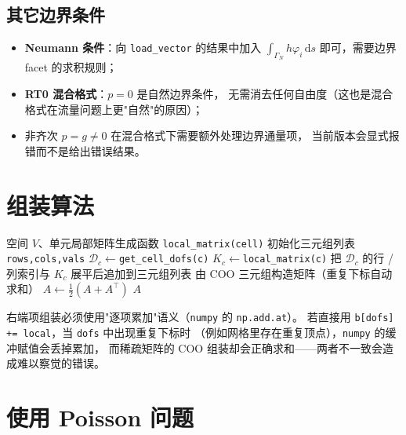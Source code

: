 \documentclass[UTF8,11pt,oneside]{ctexbook}
\theoremstyle{definition}
\theoremstyle{plain}
\newenvironment{caution}{%
  \begin{tcolorbox}[colback=orange!5,colframe=orange!55,title=注意,fonttitle=\bfseries]%
}{%
  \end{tcolorbox}%
}
\newcommand{\mosica}{\textsf{MosicaFE}}
\newcommand{\code}[1]{\texttt{#1}}
\newcommand{\dif}{\,\mathrm{d}}
\begin{document}
\subsection{其它边界条件}

\begin{itemize}[itemsep=0.2em]
  \item \textbf{Neumann 条件}：向 \code{load\_\allowbreak vector} 的结果中加入
        $\int_{\Gamma_N}h\varphi_i\dif s$ 即可，需要边界 facet 的求积规则；
  \item \textbf{RT0 混合格式}：$p=0$ 是自然边界条件，
        无需消去任何自由度（这也是混合格式在流量问题上更"自然"的原因）；
  \item 非齐次 $p=g\ne0$ 在混合格式下需要额外处理边界通量项，
        当前版本会显式报错而不是给出错误结果。
\end{itemize}

\section{组装算法}

\begin{algorithm}[htbp]
\caption{全局组装（\mosica{} 的 \code{BaseFESpace.\_assemble}）}
\label{alg:assembly}
\begin{algorithmic}[1]
\REQUIRE 空间 $V$、单元局部矩阵生成函数 \code{local\_\allowbreak matrix(cell)}
\STATE 初始化三元组列表 \code{rows,\allowbreak  cols,\allowbreak  vals}
    \STATE $\mathcal{D}_c\leftarrow$\code{get\_\allowbreak cell\_\allowbreak dofs(c)}
    \STATE $K_c\leftarrow$\code{local\_\allowbreak matrix(c)}
    \STATE 把 $\mathcal{D}_c$ 的行 / 列索引与 $K_c$ 展平后追加到三元组列表
\ENDFOR
\STATE 由 COO 三元组构造矩阵（重复下标自动求和）
    \STATE $A\leftarrow\frac12(A+A^{\top})$
\ENDIF
\RETURN $A$
\end{algorithmic}
\end{algorithm}

\begin{caution}
右端项组装必须使用"逐项累加"语义（\code{numpy} 的 \code{np.add.at}）。
若直接用 \code{b[dofs] += local}，当 \code{dofs} 中出现重复下标时
（例如网格里存在重复顶点），\code{numpy} 的缓冲赋值会丢掉累加，
而稀疏矩阵的 COO 组装却会正确求和——两者不一致会造成难以察觉的错误。
\end{caution}

\section{使用 Poisson 问题}
\end{document}
